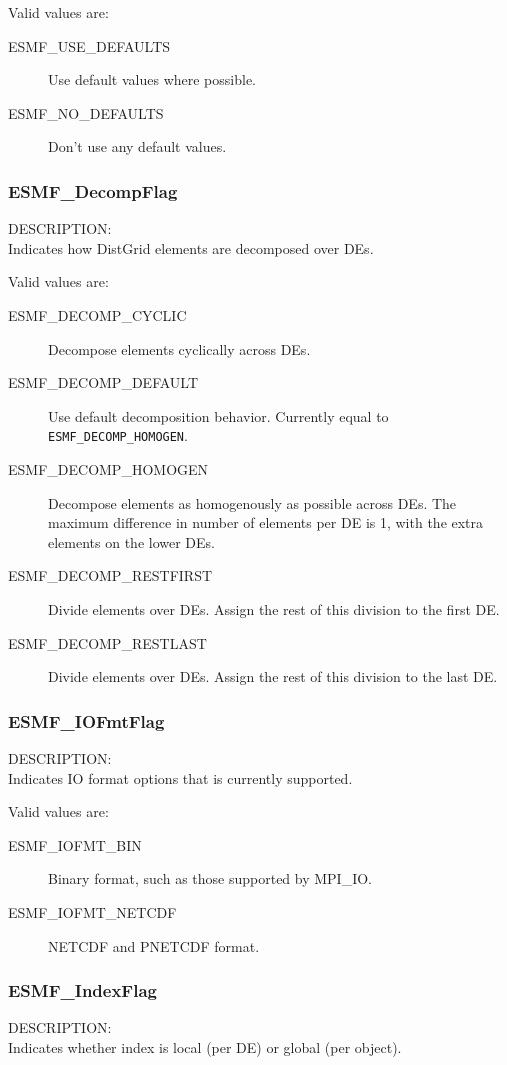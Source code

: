 Valid values are:
\begin{description}
\item [ESMF\_USE\_DEFAULTS]
      Use default values where possible.
\item [ESMF\_NO\_DEFAULTS]
      Don't use any default values.
\end{description}

\subsubsection{ESMF\_DecompFlag}
\label{opt:decompflag}
{\sf DESCRIPTION:\\}
Indicates how DistGrid elements are decomposed over DEs.

Valid values are:
\begin{description}
\item [ESMF\_DECOMP\_CYCLIC]
      Decompose elements cyclically across DEs.
\item [ESMF\_DECOMP\_DEFAULT]
      Use default decomposition behavior. Currently equal to 
      {\tt ESMF\_DECOMP\_HOMOGEN}.
\item [ESMF\_DECOMP\_HOMOGEN]
      Decompose elements as homogenously as possible across DEs. The maximum 
      difference in number of elements per DE is 1, with the extra elements on
      the lower DEs.
\item [ESMF\_DECOMP\_RESTFIRST]
      Divide elements over DEs. Assign the rest of this division to the first
      DE.
\item [ESMF\_DECOMP\_RESTLAST]
      Divide elements over DEs. Assign the rest of this division to the last DE.
\end{description}

\subsubsection{ESMF\_IOFmtFlag}
\label{opt:iofmtflag}
{\sf DESCRIPTION:\\}
Indicates IO format options that is currently supported.

Valid values are:
\begin{description}
\item [ESMF\_IOFMT\_BIN]
      Binary format, such as those supported by MPI_IO.
\item [ESMF\_IOFMT\_NETCDF]
      NETCDF and PNETCDF format.
\end{description}

\subsubsection{ESMF\_IndexFlag}
\label{opt:indexflag}
{\sf DESCRIPTION:\\}
Indicates whether index is local (per DE) or global (per object).

